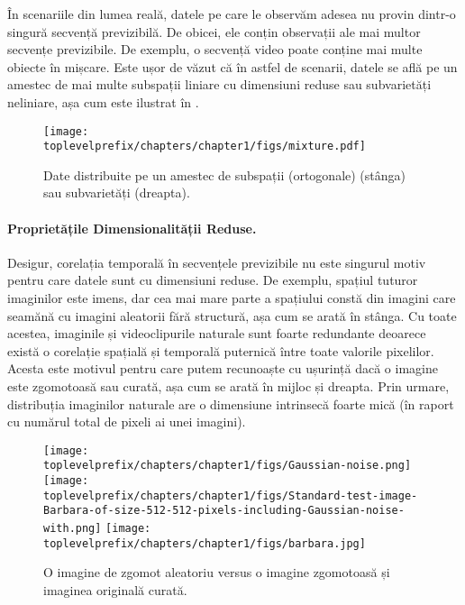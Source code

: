 \documentclass[../../book-main_ro.tex]{subfiles}
\begin{document}
În scenariile din lumea reală, datele pe care le observăm adesea nu provin dintr-o singură secvență previzibilă. De obicei, ele conțin observații ale mai multor secvențe previzibile. De exemplu, o secvență video poate conține mai multe obiecte în mișcare. Este ușor de văzut că în astfel de scenarii, datele se află pe un amestec de mai multe subspații liniare cu dimensiuni reduse sau subvarietăți neliniare, așa cum este ilustrat în .
\begin{figure}
    \centering
    \texttt{[image: \\toplevelprefix/chapters/chapter1/figs/mixture.pdf]}
    \caption{Date distribuite pe un amestec de subspații (ortogonale) (stânga) sau subvarietăți (dreapta).}
    \label{fig:mixture-models}
\end{figure}


\paragraph{Proprietățile Dimensionalității Reduse.}
Desigur, corelația temporală în secvențele previzibile nu este singurul motiv pentru care datele sunt cu dimensiuni reduse. De exemplu, spațiul tuturor imaginilor este imens, dar cea mai mare parte a spațiului constă din imagini care seamănă cu imagini aleatorii fără structură, așa cum se arată în  stânga. Cu toate acestea, imaginile și videoclipurile naturale sunt foarte redundante deoarece există o corelație spațială și temporală puternică între toate valorile pixelilor. Acesta este motivul pentru care putem recunoaște cu ușurință dacă o imagine este zgomotoasă sau curată, așa cum se arată în  mijloc și dreapta. Prin urmare, distribuția imaginilor naturale are o dimensiune intrinsecă foarte mică (în raport cu numărul total de pixeli ai unei imagini).

\begin{figure}
    \centering
    \texttt{[image: \\toplevelprefix/chapters/chapter1/figs/Gaussian-noise.png]}\hspace{2mm}
    \texttt{[image: \\toplevelprefix/chapters/chapter1/figs/Standard-test-image-Barbara-of-size-512-512-pixels-including-Gaussian-noise-with.png]} \hspace{2mm}
    \texttt{[image: \\toplevelprefix/chapters/chapter1/figs/barbara.jpg]}
    \caption{O imagine de zgomot aleatoriu versus o imagine zgomotoasă și imaginea originală curată.}
    \label{fig:noise-image}
\end{figure}
\end{document}
